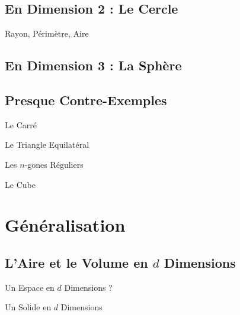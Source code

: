 \documentclass{beamercours}
\begin{document}
        \subsection{En Dimension 2 : Le Cercle}
            \begin{frame}{Rayon, Périmètre, Aire}

            \end{frame}

        \subsection{En Dimension 3 : La Sphère}

        \subsection{Presque Contre-Exemples}
            \begin{frame}{Le Carré}
                
            \end{frame}

            \begin{frame}{Le Triangle Equilatéral}
                
            \end{frame}

            \begin{frame}{Les $n$-gones Réguliers}
                
            \end{frame}

            \begin{frame}{Le Cube}
                
            \end{frame}

    \section{Généralisation}
        \subsection{L'Aire et le Volume en $d$ Dimensions}
            \begin{frame}{Un Espace en $d$ Dimensions ?}
                
            \end{frame}

            \begin{frame}{Un Solide en $d$ Dimensions}
                
            \end{frame}
\end{document}
